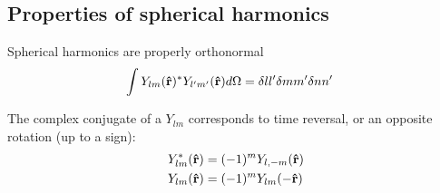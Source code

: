 \documentclass[letterpaper,twocolumn,amsmath,amssymb,pre]{revtex4-1}
\begin{document}
\subsection{Properties of spherical harmonics}

Spherical harmonics are properly orthonormal
\begin{align}
  \int Y_{lm}(\mathbf{\hat{r}})^{*}Y_{l'm'}(\mathbf{\hat{r}}) d\Omega
  &= \delta{ll'}\delta{mm'}\delta{nn'}
\end{align}

The complex conjugate of a $Y_{lm}$ corresponds to time reversal, or
an opposite rotation (up to a sign):
\begin{align}
  Y_{lm}^{*}(\mathbf{\hat{r}}) &= (-1)^{m} Y_{l,-m}(\mathbf{\hat{r}}) \\
  Y_{lm}(\mathbf{\hat{r}}) &= (-1)^{m} Y_{lm}(-\mathbf{\hat{r}})
\end{align}
\end{document}
